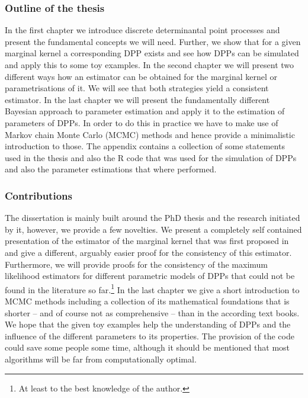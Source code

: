 \subsubsection{Outline of the thesis}
In the first chapter we introduce discrete determinantal point processes and present the fundamental concepts we will need. Further, we show that for a given marginal kernel a corresponding DPP exists and see how DPPs can be simulated and apply this to some toy examples. In the second chapter we will present two different ways how an estimator can be obtained for the marginal kernel or parametrisations of it. We will see that both strategies yield a consistent estimator. In the last chapter we will present the fundamentally different Bayesian approach to parameter estimation and apply it to the estimation of parameters of DPPs. In order to do this in practice we have to make use of Markov chain Monte Carlo (MCMC) methods and hence provide a minimalistic introduction to those.
The appendix contains a collection of some statements used in the thesis and also the R code that was used for the simulation of DPPs and also the parameter estimations that where performed.

\subsubsection{Contributions}
The dissertation is mainly built around the PhD thesis \cite{kulesza2012learning} and the research initiated by it, however, we provide a few novelties. We present a completely self contained presentation of the estimator of the marginal kernel that was first proposed in \cite{urschel2017learning} and give a different, arguably easier proof for the consistency of this estimator. Furthermore, we will provide proofs for the consistency of the maximum likelihood estimators for different parametric models of DPPs that could not be found in the literature so far.\footnote{At least to the best knowledge of the author.} In the last chapter we give a short introduction to MCMC methods including a collection of its mathematical foundations that is shorter -- and of course not as comprehensive -- than in the according text books. We hope that the given toy examples help the understanding of DPPs and the influence of the different parameters to its properties. The provision of the code could save some people some time, although it should be mentioned that most algorithms will be far from computationally optimal.


